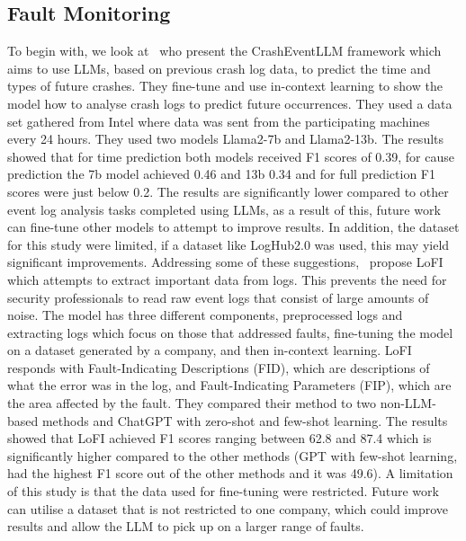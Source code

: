 \subsection{Fault Monitoring}
To begin with, we look at~\cite{mudgal2024crasheventllm} who present the CrashEventLLM framework which aims to use LLMs, based on previous crash log data, to predict the time and types of future crashes. They fine-tune and use in-context learning to show the model how to analyse crash logs to predict future occurrences. They used a data set gathered from Intel where data was sent from the participating machines every 24 hours. They used two models Llama2-7b and Llama2-13b. The results showed that for time prediction both models received F1 scores of 0.39, for cause prediction the 7b model achieved 0.46 and 13b 0.34 and for full prediction F1 scores were just below 0.2. The results are significantly lower compared to other event log analysis tasks completed using LLMs, as a result of this, future work can fine-tune other models to attempt to improve results. In addition, the dataset for this study were limited, if a dataset like LogHub2.0 was used, this may yield significant improvements. Addressing some of these suggestions,~\cite{huang2024demystifying} propose LoFI which attempts to extract important data from logs. This prevents the need for security professionals to read raw event logs that consist of large amounts of noise. The model has three different components, preprocessed logs and extracting logs which focus on those that addressed faults, fine-tuning the model on a dataset generated by a company, and then in-context learning. LoFI responds with Fault-Indicating Descriptions (FID), which are descriptions of what the error was in the log, and Fault-Indicating Parameters (FIP), which are the area affected by the fault. They compared their method to two non-LLM-based methods and ChatGPT with zero-shot and few-shot learning. The results showed that LoFI achieved F1 scores ranging between 62.8 and 87.4 which is significantly higher compared to the other methods (GPT with few-shot learning, had the highest F1 score out of the other methods and it was 49.6). A limitation of this study is that the data used for fine-tuning were restricted. Future work can utilise a dataset that is not restricted to one company, which could improve results and allow the LLM to pick up on a larger range of faults.

